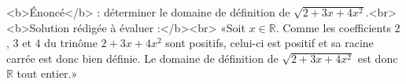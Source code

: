 <b>Énoncé</b> : déterminer le domaine de définition de $\sqrt{2+3x+4x^2}$.<br> <b>Solution rédigée à évaluer :</b><br>  «Soit $x\in\mathbb{R}$. Comme les coefficients $2$, $3$ et $4$ du trinôme $2+3x+4x^2$ sont positifs, celui-ci est positif et sa racine carrée est donc bien définie. Le domaine de définition de $\sqrt{2+3x+4x^2}$ est donc $\mathbb{R}$ tout entier.»

\begin{reponses}
\end{reponses}

\begin{comment}
Faute de raisonnement sur la justification de positivité du trinôme, donc réponse incorrecte même si le domaine est un peu par hasard le bon.
\end{comment}

